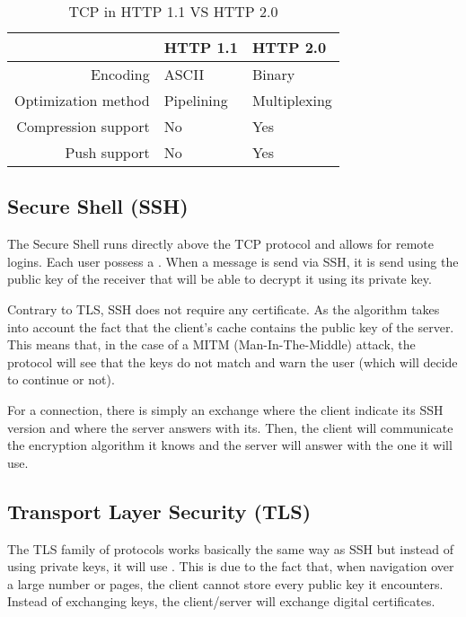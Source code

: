 \begin{table}[H]
	\centering
	\begin{tabular}{r|l|l}
	\hline 
	 & HTTP 1.1 & HTTP 2.0 \\ 
	\hline 
	Encoding & ASCII & Binary \\ 
	\hline 
	Optimization method & Pipelining & Multiplexing \\ 
	\hline 
	Compression support & No & Yes \\ 
	\hline 
	Push support & No & Yes \\ 
	\hline 
	\end{tabular}
	\caption{TCP in HTTP 1.1 VS HTTP 2.0}
\end{table}

\subsection{Secure Shell (SSH)}

The Secure Shell runs directly above the TCP protocol and allows for remote logins. Each user possess a . When a message is send via SSH, it is send using the public key of the receiver that will be able to decrypt it using its private key.

Contrary to TLS, SSH does not require any certificate. As the algorithm takes into account the fact that the client's cache contains the public key of the server. This means that, in the case of a MITM (Man-In-The-Middle) attack, the protocol will see that the keys do not match and warn the user (which will decide to continue or not).

For a connection, there is simply an exchange where the client indicate its SSH version and where the server answers with its. Then, the client will communicate the encryption algorithm it knows and the server will answer with the one it will use.

\subsection{Transport Layer Security (TLS)}

The TLS family of protocols works basically the same way as SSH but instead of using private keys, it will use . This is due to the fact that, when navigation over a large number or pages, the client cannot store every public key it encounters. Instead of exchanging keys, the client/server will exchange digital certificates.
